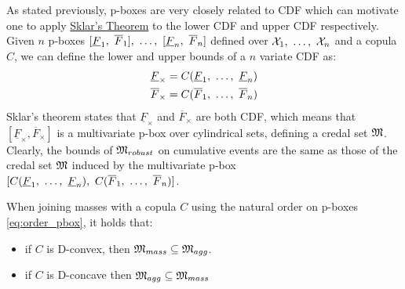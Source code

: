 As stated previously, p-boxes are very closely related to CDF which can motivate one to apply \hyperref[theorem:sklar]{Sklar's Theorem} to the lower CDF and upper CDF respectively. Given $n$ p-boxes $[\underline{F}_1,~\overline{F}_1] , ~\dots, ~ [\underline{F}_n,~\overline{F}_n]$ defined over $\mathcal{X}_1 , ~\dots, ~ \mathcal{X}_n$ and a copula $C$, we can define the lower and upper bounds of a $n$ variate CDF as:
\begin{align*}
    \underline{F}_\times&=C(\underline{F}_1 , ~\dots, ~  \underline{F}_n)\\
    \overline{F}_\times&=C(\overline{F}_1 , ~\dots, ~  \overline{F}_n)
\end{align*}
Sklar's theorem states that $\underline{F}_\times$ and $\overline{F}_\times$ are both CDF, which means that $[\underline{F}_\times, \overline{F}_\times]$ is a multivariate p-box \cite{pelessoni_bivariate_2016, montes_sklars_2015} over cylindrical sets, defining a credal set $\mathfrak{M}$. Clearly, the bounds of $\mathfrak{M}_{robust}$ on cumulative events are the same as those of the credal set $\mathfrak{M}$ induced by the multivariate p-box $[C(\underline{F}_1 , ~\dots, ~  \underline{F}_n),~C(\overline{F}_1 , ~\dots, ~  \overline{F}_n)]$.

\begin{proposition}\label{prop:convexity_pbox}
    When joining masses with a copula $C$ using the natural order on p-boxes \eqref{eq:order_pbox}, it holds that:
    \begin{itemize}
        \item if $C$ is D-convex, then $\mathfrak{M}_{mass}\subseteq \mathfrak{M}_{agg}$.
        \item if $C$ is D-concave then $\mathfrak{M}_{agg}\subseteq\mathfrak{M}_{mass}$ 
    \end{itemize}
\end{proposition}

